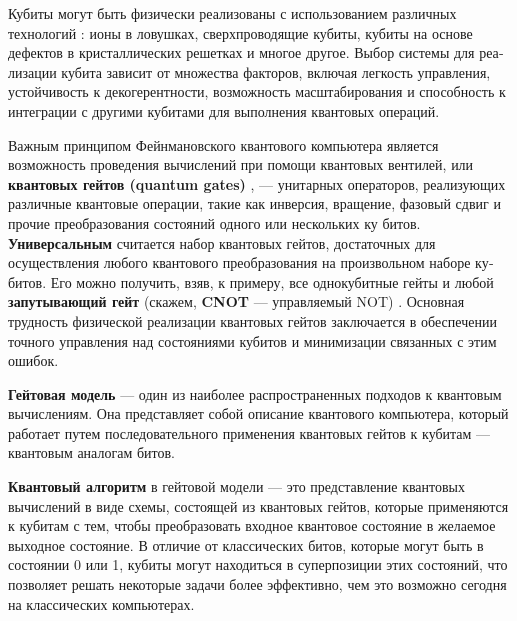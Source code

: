 Кубиты могут быть физически реализованы с использованием различных технологий \cite{valiev_1}: ионы в ловушках, сверхпроводящие кубиты, кубиты на основе дефектов в кристаллических решетках и многое другое. Выбор системы для реа­лизации кубита зависит от множества факторов, включая легкость управления, устойчивость к декогерентности, возможность масштабирования и способность к интеграции с другими кубитами для выполнения квантовых операций.

Важным принципом Фейнмановского квантового компьютера является возможность проведения вычислений при помощи квантовых вентилей, или \textbf{квантовых гейтов (quantum gates)} \cite{valiev_1,valiev_2}, --- унитарных операторов, ре­ализующих различные квантовые операции, такие как инверсия, вращение, фазовый сдвиг и прочие преобразования состояний одного или нескольких ку­ битов. \textbf{Универсальным} считается набор квантовых гейтов, достаточных для осуществления любого квантового преобразования на произвольном наборе ку­битов. Его можно получить, взяв, к примеру, все однокубитные гейты и любой \textbf{запутывающий гейт} (скажем, \textbf{CNOT} --- управляемый NOT) \cite{barenco}. Основная трудность физической реализации квантовых гейтов заключается в обеспече­нии точного управления над состояниями кубитов и минимизации связанных с этим ошибок.

\textbf{Гейтовая модель} --- один из наиболее распространенных подходов к квантовым вычислениям. Она представляет собой описание квантового компьютера, который работает путем последовательного применения кван­товых гейтов к кубитам --- квантовым аналогам битов. 

\textbf{Квантовый алгоритм} в гейтовой модели --- это представление кван­товых вычислений в виде схемы, состоящей из квантовых гейтов, которые применяются к кубитам с тем, чтобы преобразовать входное квантовое состоя­ние в желаемое выходное состояние. В отличие от классических битов, которые могут быть в состоянии 0 или 1, кубиты могут находиться в суперпозиции этих состояний, что позволяет решать некоторые задачи более эффективно, чем это возможно сегодня на классических компьютерах.

\begin{figure}[h!]
	\noindent{}
\end{figure}

